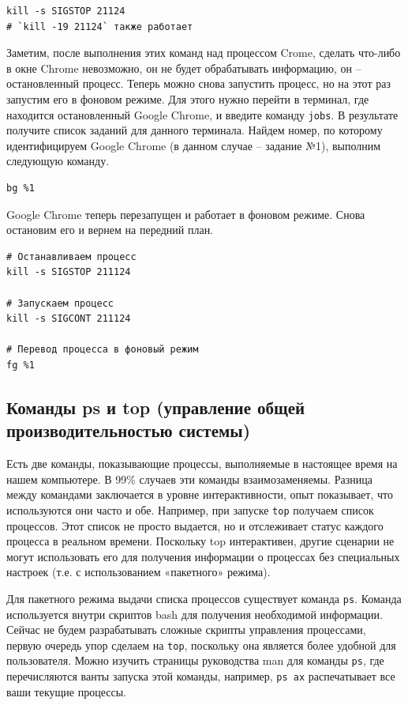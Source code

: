 \documentclass[a4paper,12pt,final,openany]{extbook}
\begin{document}
\begin{verbatim}
kill -s SIGSTOP 21124
# `kill -19 21124` также работает
\end{verbatim}
Заметим, после выполнения этих команд над процессом Crome, сделать что-либо в окне Chrome невозможно, он не
будет обрабатывать информацию, он -- остановленный процесс. Теперь можно снова
запустить процесс, но на этот раз запустим его в фоновом режиме. Для
этого нужно перейти в терминал, где находится остановленный Google
Chrome, и введите команду \texttt{jobs}. В результате получите список
заданий для данного терминала. Найдем номер, по которому идентифицируем
Google Chrome (в данном случае -- задание №1), выполним следующую команду.
\begin{verbatim}
bg %1
\end{verbatim}

Google Chrome теперь перезапущен и работает в фоновом режиме. Снова
остановим его и вернем на передний план.
\begin{verbatim}
# Останавливаем процесс
kill -s SIGSTOP 211124

# Запускаем процесс
kill -s SIGCONT 211124

# Перевод процесса в фоновый режим
fg %1
\end{verbatim}

\hypertarget{ps-and-top-commands-system-performance-management}{%
\subsection{\texorpdfstring{\protect\hyperlink{ps-and-top-commands-system-performance-management}{}Команды
ps и top (управление общей производительностью
системы)}{Команды ps и top (управление общей производительностью системы)}}\label{ps-and-top-commands-system-performance-management}}

Есть две команды, показывающие процессы, выполняемые в настоящее время
на нашем компьютере. В 99\% случаев эти команды взаимозаменяемы. Разница
между командами заключается в уровне интерактивности, опыт показывает,
что используются они часто и обе. Например, при запуске \texttt{top}
получаем список процессов. Этот список не просто выдается, но и
отслеживает статус каждого процесса в реальном времени. Поскольку top интерактивен, другие сценарии не могут использовать его для получения
информации о процессах без специальных настроек (т.е. с использованием
«пакетного» режима).

Для пакетного режима выдачи списка процессов существует команда \texttt{ps}. Команда
используется внутри скриптов bash для получения необходимой информации.
Сейчас не будем разрабатывать сложные скрипты управления
процессами, первую очередь упор сделаем на \texttt{top}, поскольку она
является более удобной для пользователя. Можно изучить страницы
руководства man для команды \texttt{ps}, где перечисляются ванты запуска
этой команды, например, \texttt{ps\ ax} распечатывает все ваши текущие процессы.
\end{document}
